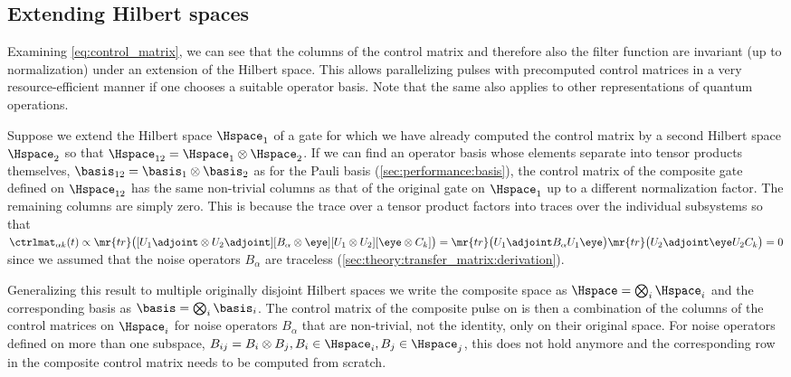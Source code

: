 \subsection{Extending Hilbert spaces}\label{sec:performance:extending_hilbert_spaces}
Examining \cref{eq:control_matrix}, we can see that the columns of the control matrix and therefore also the filter function are invariant (up to normalization) under an extension of the Hilbert space. This allows parallelizing pulses with precomputed control matrices in a very resource-efficient manner if one chooses a suitable operator basis. Note that the same also applies to other representations of quantum operations.

Suppose we extend the Hilbert space $\Hspace_1$ of a gate for which we have already computed the control matrix by a second Hilbert space $\Hspace_2$ so that $\Hspace_{12} = \Hspace_1\otimes\Hspace_2$. If we can find an operator basis whose elements separate into tensor products themselves, \ie $\basis_{12} = \basis_1\otimes\basis_2$ as for the Pauli basis (\cf \cref{sec:performance:basis}), the control matrix of the composite gate defined on $\Hspace_{12}$ has the same non-trivial columns as that of the original gate on $\Hspace_1$ up to a different normalization factor. The remaining columns are simply zero. This is because the trace over a tensor product factors into traces over the individual subsystems so that $\ctrlmat_{\alpha k}(t)\propto\mr{tr}\bigl([U_1\adjoint\otimes U_2\adjoint][B_\alpha\otimes\eye][U_1\otimes U_2][\eye\otimes C_k]\bigr) = \mr{tr}\bigl(U_1\adjoint B_\alpha U_1\eye\bigr)\mr{tr}\bigl(U_2\adjoint\eye U_2 C_k\bigr) = 0$ since we assumed that the noise operators $B_\alpha$ are traceless (\cf \cref{sec:theory:transfer_matrix:derivation}).

Generalizing this result to multiple originally disjoint Hilbert spaces we write the composite space as $\Hspace = \bigotimes_i\Hspace_i$ and the corresponding basis as $\basis = \bigotimes_i\basis_i$. The control matrix of the composite pulse on \Hspace is then a combination of the columns of the control matrices on $\Hspace_i$ for noise operators $B_\alpha$ that are non-trivial, \ie not the identity, only on their original space. For noise operators defined on more than one subspace, \eg $B_{ij} = B_i\otimes B_j, B_i\in\Hspace_i, B_j\in\Hspace_j$, this does not hold anymore and the corresponding row in the composite control matrix needs to be computed from scratch.

